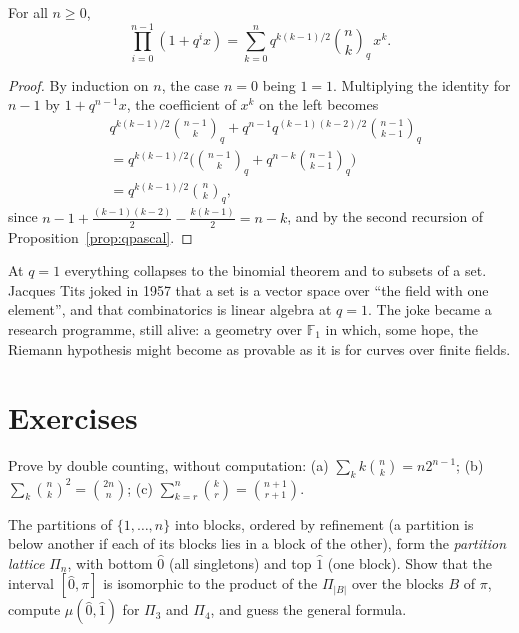 \begin{theorem}\label{thm:qbinomial}
For all $n\ge0$,
\[
\prod_{i=0}^{n-1}(1+q^ix)=\sum_{k=0}^nq^{k(k-1)/2}\binom nk_{\!q}\,x^k.
\]
\end{theorem}
\begin{proof}
By induction on $n$, the case $n=0$ being $1=1$. Multiplying the identity for $n-1$ by $1+q^{n-1}x$, the coefficient of $x^k$ on the left
becomes
\[
\begin{aligned}{}&q^{k(k-1)/2}\binom{n-1}k_{\!q}+q^{n-1}q^{(k-1)(k-2)/2}\binom{n-1}{k-1}_{\!q}\\&=q^{k(k-1)/2}\Big(\binom{n-1}k_{\!q}+q^{n-k}\binom{n-1}{k-1}_{\!q}\Big)\\&=q^{k(k-1)/2}\binom nk_{\!q},\end{aligned}
\]
since $n-1+\frac{(k-1)(k-2)}2-\frac{k(k-1)}2=n-k$, and by the second recursion of Proposition~\ref{prop:qpascal}.
\end{proof}

\begin{beauty}
At $q=1$ everything collapses to the binomial theorem and to subsets of a set. Jacques Tits joked in 1957 that a set is a vector
space over ``the field with one element'', and that combinatorics is linear algebra at $q=1$. The joke became a research
programme, still alive: a geometry over $\mathbb F_1$ in which, some hope, the Riemann hypothesis might become as provable as it is
for curves over finite fields.
\end{beauty}

\section{Exercises}

\begin{exercise}[$\star$]\label{ex:binomdouble}
Prove by double counting, without computation: (a) $\sum_kk\binom nk=n2^{n-1}$; (b) $\sum_k\binom nk^2=\binom{2n}n$; (c) $\sum_{k=r}^n\binom kr=\binom{n+1}{r+1}$.
\end{exercise}

\begin{exercise}[$\star\star$]\label{ex:partitionlattice}
The partitions of $\{1,\dots,n\}$ into blocks, ordered by refinement (a partition is below another if each of its blocks lies in a
block of the other), form the \emph{partition lattice} $\Pi_n$, with bottom $\hat0$ (all singletons) and top $\hat1$ (one block). Show that the
interval $[\hat0,\pi]$ is isomorphic to the product of the $\Pi_{|B|}$ over the blocks $B$ of $\pi$, compute $\mu(\hat0,\hat1)$ for $\Pi_3$ and $\Pi_4$, and guess
the general formula.
\end{exercise}


